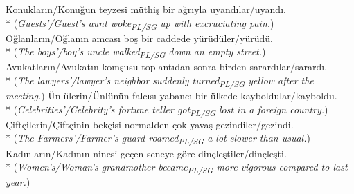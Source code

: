 \ex Konuklar{\i}n/Konu\u{g}un teyzesi m\"{u}thi\c{s} bir a\u{g}r{\i}yla uyand{\i}lar/uyand{\i}.\\*
({\it Guests'/Guest's aunt woke\textsubscript{PL/SG} up with excruciating pain.})
\ex O\u{g}lanlar{\i}n/O\u{g}lan{\i}n amcas{\i} bo\c{s} bir caddede y\"{u}r\"{u}d\"{u}ler/y\"{u}r\"{u}d\"{u}.\\*
({\it The boys'/boy's uncle walked\textsubscript{PL/SG} down an empty street.})
\ex Avukatlar{\i}n/Avukat{\i}n kom\c{s}usu toplant{\i}dan sonra birden sarard{\i}lar/sarard{\i}.\\*
({\it The lawyers'/lawyer's neighbor suddenly turned\textsubscript{PL/SG} yellow after the meeting.})
\ex \"{U}nl\"{u}lerin/\"{U}nl\"{u}n\"{u}n falc{\i}s{\i} yabanc{\i} bir \"{u}lkede kayboldular/kayboldu.\\*
({\it Celebrities'/Celebrity's fortune teller got\textsubscript{PL/SG} lost in a foreign country.})
\ex \c{C}ift\c{c}ilerin/\c{C}ift\c{c}inin bek\c{c}isi normalden \c{c}ok yava\c{s} gezindiler/gezindi.\\*
({\it The Farmers'/Farmer's guard roamed\textsubscript{PL/SG} a lot slower than usual.})
\ex Kad{\i}nlar{\i}n/Kad{\i}n{\i}n ninesi ge\c{c}en seneye g\"{o}re din\c{c}le\c{s}tiler/din\c{c}le\c{s}ti.\\*
({\it Women's/Woman's grandmother became\textsubscript{PL/SG} more vigorous compared to last year.})
\z

